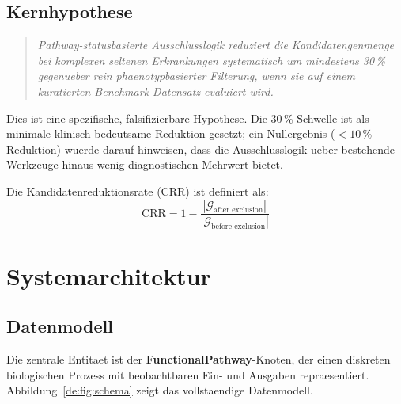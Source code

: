 \documentclass[12pt,a4paper]{article}
\begin{document}
\subsection*{Kernhypothese}

\begin{quote}
\emph{Pathway-statusbasierte Ausschlusslogik reduziert die Kandidatengenmenge bei komplexen seltenen Erkrankungen systematisch um mindestens 30\,\% gegenueber rein phaenotypbasierter Filterung, wenn sie auf einem kuratierten Benchmark-Datensatz evaluiert wird.}
\end{quote}

Dies ist eine spezifische, falsifizierbare Hypothese. Die 30\,\%-Schwelle ist als minimale klinisch bedeutsame Reduktion gesetzt; ein Nullergebnis ($<10\,\%$ Reduktion) wuerde darauf hinweisen, dass die Ausschlusslogik ueber bestehende Werkzeuge hinaus wenig diagnostischen Mehrwert bietet.

Die Kandidatenreduktionsrate (CRR) ist definiert als:
\begin{equation}
    \text{CRR} = 1 - \frac{|\mathcal{G}_{\text{after exclusion}}|}{|\mathcal{G}_{\text{before exclusion}}|}
\end{equation}

\section*{Systemarchitektur}
\label{de:sec:architecture}

\subsection*{Datenmodell}
\label{de:sec:datamodel}

Die zentrale Entitaet ist der \textbf{FunctionalPathway}-Knoten, der einen diskreten biologischen Prozess mit beobachtbaren Ein- und Ausgaben repraesentiert. Abbildung~\ref{de:fig:schema} zeigt das vollstaendige Datenmodell.
\end{document}
